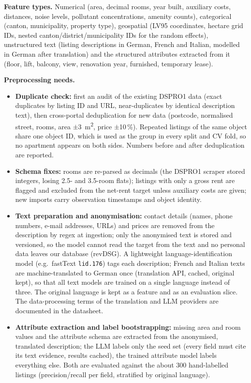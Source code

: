 \documentclass[11pt,a4paper]{article}
\begin{document}
\textbf{Feature types.} Numerical (area, decimal rooms, year built, auxiliary costs, distances, noise levels, pollutant concentrations, amenity counts), categorical (canton, municipality, property type), geospatial (LV95 coordinates, hectare grid IDs, nested canton/district/municipality IDs for the random effects), unstructured text (listing descriptions in German, French and Italian, modelled in German after translation) and the structured attributes extracted from it (floor, lift, balcony, view, renovation year, furnished, temporary lease).

\textbf{Preprocessing needs.}
\begin{itemize}
    \item \textbf{Duplicate check:} first an audit of the existing DSPRO1 data (exact duplicates by listing ID and URL, near-duplicates by identical description text), then cross-portal deduplication for new data (postcode, normalised street, rooms, area $\pm$3~m\textsuperscript{2}, price $\pm$10\,\%). Repeated listings of the same object share one object ID, which is used as the group in every split and CV fold, so no apartment appears on both sides. Numbers before and after deduplication are reported.
    \item \textbf{Schema fixes:} rooms are re-parsed as decimals (the DSPRO1 scraper stored integers, losing 2.5- and 3.5-room flats); listings with only a gross rent are flagged and excluded from the net-rent target unless auxiliary costs are given; new imports carry observation timestamps and object identity.
    \item \textbf{Text preparation and anonymisation:} contact details (names, phone numbers, e-mail addresses, URLs) and prices are removed from the description by regex at ingestion; only the anonymised text is stored and versioned, so the model cannot read the target from the text and no personal data leaves our database (revDSG). A lightweight language-identification model (e.g.\ fastText \texttt{lid.176}) tags each description; French and Italian texts are machine-translated to German once (translation API, cached, original kept), so that all text models are trained on a single language instead of three. The original language is kept as a feature and as an evaluation slice. The data-processing terms of the translation and LLM providers are documented in the datasheet.
    \item \textbf{Attribute extraction and label bootstrapping:} missing area and room values and the attribute schema are extracted from the anonymised, translated description; the LLM labels only the seed set (every field must cite its text evidence, results cached), the trained attribute model labels everything else. Both are evaluated against the about 300 hand-labelled listings (precision/recall per field, stratified by original language).

\end{itemize}
\end{document}
